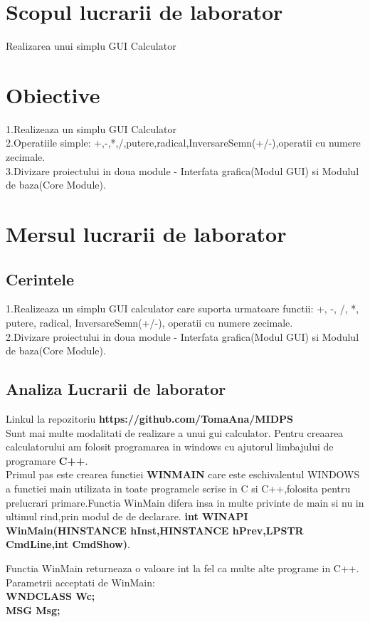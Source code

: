 \documentclass[12pt,a4paper,titlepage]{article}
\begin{document}
 \section{Scopul lucrarii de laborator}
Realizarea unui simplu GUI Calculator

\section{Obiective}
1.Realizeaza un simplu GUI Calculator\\
2.Operatiile simple: +,-,*,/,putere,radical,InversareSemn(+/-),operatii cu numere zecimale.\\
3.Divizare proiectului in doua module - Interfata grafica(Modul GUI) si Modulul de baza(Core Module).
\clearpage
\section{Mersul lucrarii de laborator}

\subsection{Cerintele}

1.Realizeaza un simplu GUI calculator care suporta urmatoare functii: +, -, /, *, putere, radical, InversareSemn(+/-), operatii cu numere zecimale.\\
2.Divizare proiectului in doua module - Interfata grafica(Modul GUI) si Modulul de baza(Core Module).\\

\subsection{Analiza Lucrarii de laborator}
\tab Linkul la repozitoriu \textbf{https://github.com/TomaAna/MIDPS}\\
Sunt mai multe modalitati de  realizare a unui gui calculator.
Pentru creaarea calculatorului am folosit programarea in windows cu ajutorul limbajului de programare  \textbf{C++}.\\
\tab Primul pas este crearea functiei \textbf {WINMAIN} care este eschivalentul WINDOWS a functiei main utilizata in toate programele scrise
in C si C++,folosita pentru prelucrari primare.Functia WinMain difera insa in multe privinte de main si nu in ultimul rind,prin modul de
de declarare.
\textbf{int WINAPI WinMain(HINSTANCE hInst,HINSTANCE hPrev,LPSTR CmdLine,int CmdShow)}. 

 \tab Functia WinMain returneaza  o valoare int la fel ca multe alte programe in C++.
 Parametrii acceptati de WinMain: \\ \textbf{WNDCLASS Wc;}\\
\textbf{ MSG      Msg;}\\
\end{document}
